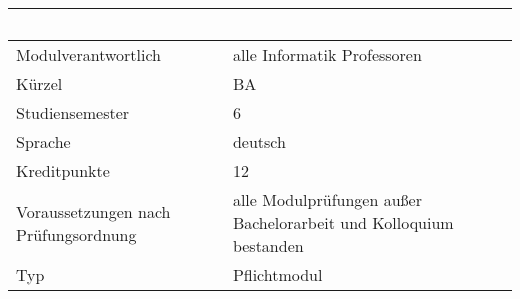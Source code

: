 \begin{longtable}[]{@{}ll@{}}
\toprule
\begin{minipage}[b]{0.12\columnwidth}\raggedright\strut
~\strut
\end{minipage} & \begin{minipage}[b]{0.12\columnwidth}\raggedright\strut
~\strut
\end{minipage}\tabularnewline
\midrule
\endhead
\begin{minipage}[t]{0.12\columnwidth}\raggedright\strut
Modulverantwortlich\strut
\end{minipage} & \begin{minipage}[t]{0.12\columnwidth}\raggedright\strut
alle Informatik Professoren\strut
\end{minipage}\tabularnewline
\begin{minipage}[t]{0.12\columnwidth}\raggedright\strut
Kürzel\strut
\end{minipage} & \begin{minipage}[t]{0.12\columnwidth}\raggedright\strut
BA\strut
\end{minipage}\tabularnewline
\begin{minipage}[t]{0.12\columnwidth}\raggedright\strut
Studiensemester\strut
\end{minipage} & \begin{minipage}[t]{0.12\columnwidth}\raggedright\strut
6\strut
\end{minipage}\tabularnewline
\begin{minipage}[t]{0.12\columnwidth}\raggedright\strut
Sprache\strut
\end{minipage} & \begin{minipage}[t]{0.12\columnwidth}\raggedright\strut
deutsch\strut
\end{minipage}\tabularnewline
\begin{minipage}[t]{0.12\columnwidth}\raggedright\strut
Kreditpunkte\strut
\end{minipage} & \begin{minipage}[t]{0.12\columnwidth}\raggedright\strut
12\strut
\end{minipage}\tabularnewline
\begin{minipage}[t]{0.12\columnwidth}\raggedright\strut
Voraussetzungen nach Prüfungsordnung\strut
\end{minipage} & \begin{minipage}[t]{0.12\columnwidth}\raggedright\strut
alle Modulprüfungen außer Bachelorarbeit und Kolloquium bestanden\strut
\end{minipage}\tabularnewline
\begin{minipage}[t]{0.12\columnwidth}\raggedright\strut
Typ\strut
\end{minipage} & \begin{minipage}[t]{0.12\columnwidth}\raggedright\strut
Pflichtmodul\strut
\end{minipage}\tabularnewline
\bottomrule
\end{longtable}


